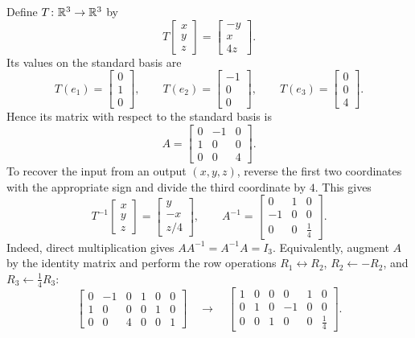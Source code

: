 \begin{example}\label{ex:rotation-scaling-inverse}
  Define $T\colon\mathbb{R}^3\to\mathbb{R}^3$ by
  \[
    T\begin{bmatrix}x\\y\\z\end{bmatrix}
      =\begin{bmatrix}-y\\x\\4z\end{bmatrix}.
  \]
  Its values on the standard basis are
  \[
    T(e_1)=\begin{bmatrix}0\\1\\0\end{bmatrix},
    \qquad
    T(e_2)=\begin{bmatrix}-1\\0\\0\end{bmatrix},
    \qquad
    T(e_3)=\begin{bmatrix}0\\0\\4\end{bmatrix}.
  \]
  Hence its matrix with respect to the standard basis is
  \[
    A=\begin{bmatrix}0&-1&0\\1&0&0\\0&0&4\end{bmatrix}.
  \]
  To recover the input from an output $(x,y,z)$, reverse the first
  two coordinates with the appropriate sign and divide the third
  coordinate by $4$. This gives
  \[
    T^{-1}\begin{bmatrix}x\\y\\z\end{bmatrix}
      =\begin{bmatrix}y\\-x\\z/4\end{bmatrix},
    \qquad
    A^{-1}=\begin{bmatrix}0&1&0\\-1&0&0\\0&0&\tfrac14\end{bmatrix}.
  \]
  Indeed, direct multiplication gives $AA^{-1}=A^{-1}A=I_3$.
  Equivalently, augment $A$ by the identity matrix and perform the
  row operations $R_1\leftrightarrow R_2$, $R_2\leftarrow-R_2$,
  and $R_3\leftarrow\tfrac14 R_3$:
  \[
    \left[\begin{array}{ccc|ccc}
      0&-1&0&1&0&0\\
      1&0&0&0&1&0\\
      0&0&4&0&0&1
    \end{array}\right]
    \quad\longrightarrow\quad
    \left[\begin{array}{ccc|ccc}
      1&0&0&0&1&0\\
      0&1&0&-1&0&0\\
      0&0&1&0&0&\tfrac14
    \end{array}\right].
  \]
\end{example}

